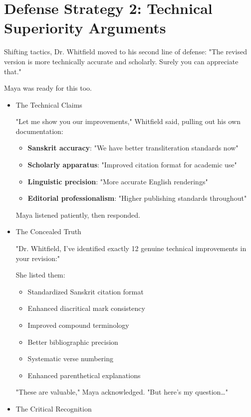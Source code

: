\documentclass[11pt,twoside]{book}
\begin{document}
\section*{Defense Strategy 2: Technical Superiority Arguments}
\label{sec:org1ce8346}

Shifting tactics, Dr. Whitfield moved to his second line of defense: "The revised version is more technically accurate and scholarly. Surely you can appreciate that."

Maya was ready for this too.
\begin{itemize}
\item The Technical Claims
\label{sec:org6bb522a}

"Let me show you our improvements," Whitfield said, pulling out his own documentation:

\begin{itemize}
\item \textbf{\textbf{Sanskrit accuracy}}: "We have better transliteration standards now"
\item \textbf{\textbf{Scholarly apparatus}}: "Improved citation format for academic use"
\item \textbf{\textbf{Linguistic precision}}: "More accurate English renderings"
\item \textbf{\textbf{Editorial professionalism}}: "Higher publishing standards throughout"
\end{itemize}

Maya listened patiently, then responded.
\item The Concealed Truth
\label{sec:org207a8b3}

"Dr. Whitfield, I've identified exactly 12 genuine technical improvements in your revision:"

She listed them:
\begin{itemize}
\item Standardized Sanskrit citation format
\item Enhanced diacritical mark consistency
\item Improved compound terminology
\item Better bibliographic precision
\item Systematic verse numbering
\item Enhanced parenthetical explanations
\end{itemize}

"These are valuable," Maya acknowledged. "But here's my question\ldots{}"
\item The Critical Recognition
\label{sec:orgb4f4ee2}


\end{itemize}
\end{document}
